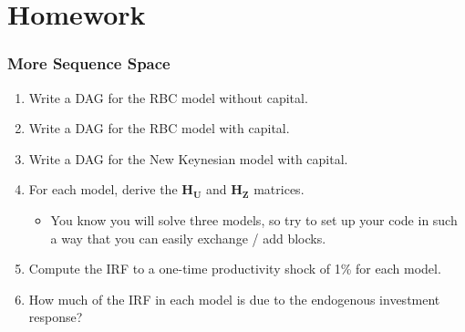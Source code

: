 \documentclass[english,xcolor=svgnames]{beamer}
\begin{document}
\section{Homework}

\begin{frame}
    \frametitle{More Sequence Space}
    \begin{enumerate}
        \item Write a DAG for the RBC model without capital.
        \item Write a DAG for the RBC model with capital.
        \item Write a DAG for the New Keynesian model with capital.
        \item For each model, derive the $\mathbf{H}_{\mathbf{U}}$ and $\mathbf{H}_{\mathbf{Z}}$ matrices.
        \begin{itemize}
			\item You know you will solve three models, so try to set up your code in such a way that you can easily exchange / add blocks.
		\end{itemize}
		\item Compute the IRF to a one-time productivity shock of 1\% for each model. 
		\item How much of the IRF in each model is due to the endogenous investment response?
	\end{enumerate}
\end{frame}


\end{document}
